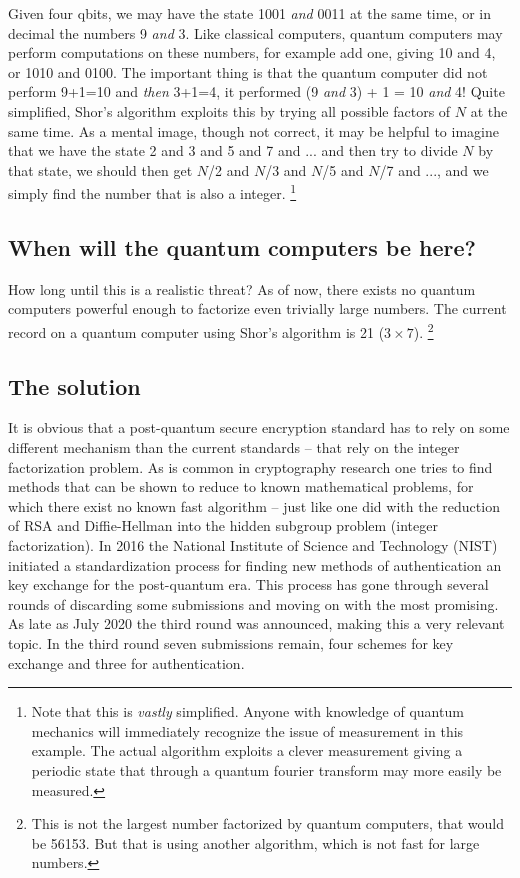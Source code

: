 \documentclass[conference]{IEEEtran}
\begin{document}
Given four qbits, we may have the state 1001 \emph{and} 0011 at the same time, or in decimal the numbers 9 \emph{and} 3.
Like classical computers, quantum computers may perform computations on these numbers, for example add one, giving 10 and 4, or 1010 and 0100.
The important thing is that the quantum computer did not perform 9+1=10 and \emph{then} 3+1=4, it performed (9 \emph{and} 3) + 1 = 10 \emph{and} 4!
Quite simplified, Shor's algorithm exploits this by trying all possible factors of $N$ at the same time.
As a mental image, though not correct, it may be helpful to imagine that we have the state 2 and 3 and 5 and 7 and ... and then try to divide $N$ by that state, we should then get $N$/2 and $N$/3 and $N$/5 and $N$/7 and ..., and we simply find the number that is also a integer. \footnote{Note that this is \emph{vastly} simplified. Anyone with knowledge of quantum mechanics will immediately recognize the issue of measurement in this example. The actual algorithm exploits a clever measurement giving a periodic state that through a quantum fourier transform may more easily be measured.}



\subsection{When will the quantum computers be here?}
How long until this is a realistic threat?
As of now, there exists no quantum computers powerful enough to factorize even trivially large numbers.
The current record on a quantum computer using Shor's algorithm is 21 ($3\times7$)\cite{shor21}. \footnote{This is not the largest number factorized by quantum computers, that would be 56153. But that is using another algorithm, which is not fast for large numbers.}

\subsection{The solution}
It is obvious that a post-quantum secure encryption standard has to rely on some different mechanism than the current standards -- that rely on the integer factorization problem.
As is common in cryptography research one tries to find methods that can be shown to reduce to known mathematical problems, for which there exist no known fast algorithm -- just like one did with the reduction of RSA and Diffie-Hellman into the hidden subgroup problem (integer factorization).
In 2016 the National Institute of Science and Technology (NIST) initiated a standardization process for finding new methods of authentication an key exchange for the post-quantum era.
This process has gone through several rounds of discarding some submissions and moving on with the most promising.
As late as July 2020 the third round was announced, making this a very relevant topic.
In the third round seven submissions remain, four schemes for key exchange and three for authentication.
\end{document}
